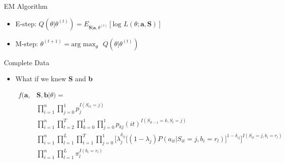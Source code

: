 \documentclass{beamer}
\begin{document}
\begin{frame}{EM Algorithm }
\begin{itemize}
    \item E-step: $Q(\theta|\theta^{(t)}) = E_{\textbf{S}|\textbf{a},\theta^{(t)}}[\text{log }L(\theta ;\textbf{a},\textbf{S})]$
    \item M-step: $\theta^{(t+1)} = \text{arg max}_\theta \text{ } Q(\theta|\theta^{(t)}) $
\end{itemize} 

\end{frame}


\begin{frame}{Complete Data}

\begin{itemize}
    \item What if we knew \textbf{S} and \textbf{b}
    \bigskip
    \begin{adjustwidth}{-2.5em}{-2.5em}
    $\begin{aligned}
        f(\textbf{a},&\textbf{S}, \textbf{b} | \theta)  = \\
        &\prod_{i=1}^n \prod_{j=0}^1 p_j^{I(S_{i1}=j)} \\
    & \prod_{i=1}^n \prod^T_{t=2} \prod_{k=0}^1 \prod_{j=0}^1  
        p_{kj}(it)^{I(S_{it-1}=k,S_{t}=j)} \\ 
    & \prod_{i=1}^n\prod_{l=1}^L \prod^T_{t=1}\prod_{j=0}^1 \biggr[
        \lambda_j^{\delta_{ij}} \big[(1-\lambda_j)P(a_{it}|S_{it}=j,b_i=r_l)\big]^{1-\delta_{ij}}
        \biggr]^{I(S_{it}=j,b_i=r_l)} \\
    & \prod_{i=1}^n\prod_{l=1}^L \pi_l^{I(b_i=r_l)}
    \end{aligned}$
    \end{adjustwidth}
    \bigskip


\end{itemize}

\end{frame}
\end{document}
